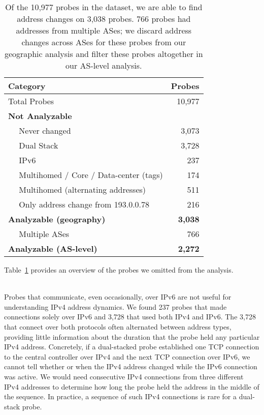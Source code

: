 \begin{table}[th]
  \small
  \centering
  \begin{tabular}{ l|r }
    \textbf{Category} & \textbf{Probes} \\
    \hline
    Total Probes & 10,977\\
    \hline
    \textbf{Not Analyzable} &  \\
    ~~ Never changed & 3,073\\
    ~~ Dual Stack & 3,728\\
    ~~ IPv6 & 237\\
    ~~ Multihomed / Core / Data-center (tags) &  174\\
    ~~ Multihomed (alternating addresses) & 511\\
    ~~ Only address change from 193.0.0.78 & 216 \\
    \hline
    \textbf{Analyzable (geography)} & \textbf{3,038} \\
    \hline
    ~~ Multiple ASes & 766\\
    \textbf{Analyzable (AS-level)} & \textbf{2,272} \\
    \end{tabular}
    \caption[Filtering RIPE Atlas probes]{Of the 10,977 probes in the dataset, we are able to find address changes on 3,038 probes. 766 probes had addresses from multiple ASes; we discard address changes across ASes for these probes from our geographic analysis and filter these probes altogether in our AS-level analysis.}
    \label{tbl:filtered}
\end{table}

Table~\ref{tbl:filtered} provides an overview of the probes
we omitted from the analysis.

\par {}\\
Probes that communicate, even occasionally, over IPv6 are not
useful for understanding IPv4 address dynamics.  We found 
237 probes that made connections solely over
IPv6 and 3,728 that used both IPv4 and IPv6.  The 3,728 that connect over both
protocols often alternated between address types, providing
little information about the duration that the probe held any particular
IPv4 address.  Concretely, if a dual-stacked probe established one TCP
connection to the central controller over IPv4 and the next TCP
connection over IPv6, we cannot tell whether or when the IPv4
address changed while the IPv6 connection was active.  We would need consecutive
IPv4 connections from three different IPv4 addresses to determine
how long the probe held the address in the middle of the sequence.   In
practice, a sequence of such IPv4 connections is rare for a dual-stack probe.

